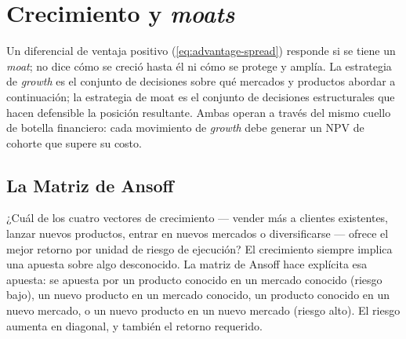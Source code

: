 \chapter{Crecimiento y \emph{moats}}\label{ch:growth}


Un diferencial de ventaja positivo (\cref{eq:advantage-spread}) responde si se tiene un
\emph{moat}; no dice cómo se creció hasta él ni cómo se protege y amplía. La estrategia de
\emph{growth} es el conjunto de decisiones sobre qué mercados y productos abordar a
continuación; la estrategia de moat es el conjunto de decisiones estructurales que hacen
defensible la posición resultante. Ambas operan a través del mismo cuello de botella
financiero: cada movimiento de \emph{growth} debe generar un NPV de cohorte que supere su
costo.

\section{La Matriz de Ansoff}\label{sec:ansoff-matrix}

¿Cuál de los cuatro vectores de crecimiento --- vender más a clientes existentes, lanzar
nuevos productos, entrar en nuevos mercados o diversificarse --- ofrece el mejor retorno por
unidad de riesgo de ejecución? El crecimiento siempre implica una apuesta sobre algo
desconocido. La matriz de Ansoff hace explícita esa apuesta: se apuesta por un producto
conocido en un mercado conocido (riesgo bajo), un nuevo producto en un mercado conocido,
un producto conocido en un nuevo mercado, o un nuevo producto en un nuevo mercado (riesgo
alto). El riesgo aumenta en diagonal, y también el retorno requerido.

